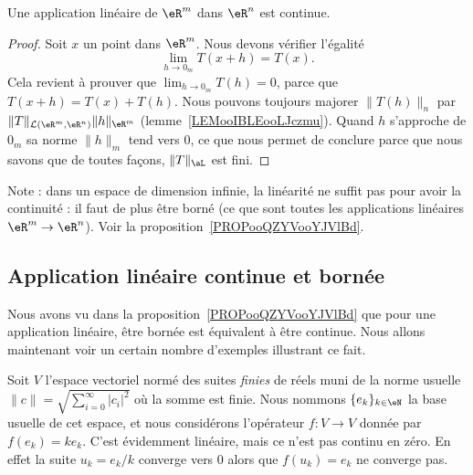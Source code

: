 \begin{proposition}
    Une application linéaire de \( \eR^m\) dans \( \eR^n\) est continue.
\end{proposition}

\begin{proof}
      Soit $x$ un point dans $\eR^m$. Nous devons vérifier l'égalité
      \begin{equation}
       \lim_{h\to 0_m}T(x+h)=T(x).
      \end{equation}
      Cela revient à prouver que $\lim_{h\to 0_m}T(h)=0$, parce que $T(x+h)=T(x)+T(h)$. Nous pouvons toujours majorer $\|T(h)\|_n$ par $\|T\|_{\mathcal{L}(\eR^m,\eR^n)}\| h \|_{\eR^m}$ (lemme~\ref{LEMooIBLEooLJczmu}). Quand $h$ s'approche de $ 0_m $ sa norme $\|h\|_m$ tend vers $0$, ce que nous permet de conclure parce que nous savons que de toutes façons, $\| T \|_{\aL}$ est fini.
\end{proof}

Note : dans un espace de dimension infinie, la linéarité ne suffit pas pour avoir la continuité : il faut de plus être borné (ce que sont toutes les applications linéaires \( \eR^m\to\eR^n\)). Voir la proposition~\ref{PROPooQZYVooYJVlBd}.

\subsection{Application linéaire continue et bornée}

Nous avons vu dans la proposition~\ref{PROPooQZYVooYJVlBd} que pour une application linéaire, être bornée est équivalent à être continue. Nous allons maintenant voir un certain nombre d'exemples illustrant ce fait.

\begin{example}  \label{ExHKsIelG}
    Soit \( V\) l'espace vectoriel normé des suites \emph{finies} de réels muni de la norme usuelle $\| c \|=\sqrt{\sum_{i=0}^{\infty}| c_i |^2}$ où la somme est finie. Nous nommons \( \{ e_k \}_{k\in \eN}\) la base usuelle de cet espace, et nous considérons l'opérateur \( f\colon V\to V\) donnée par \( f(e_k)=ke_k\). C'est évidemment linéaire, mais ce n'est pas continu en zéro. En effet la suite \( u_k=e_k/k\) converge vers \( 0\) alors que \( f(u_k)=e_k\) ne converge pas.
\end{example}

